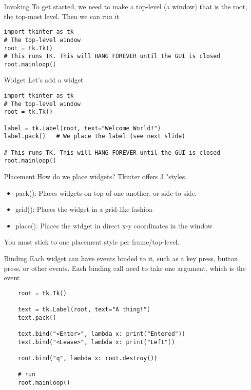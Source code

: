 \begin{frame}[containsverbatim]{Invoking}
To get started, we need to make a top-level (a window) that is the root, the top-most level. Then we can run it
    \begin{verbatim}
import tkinter as tk
# The top-level window
root = tk.Tk()
# This runs TK. This will HANG FOREVER until the GUI is closed
root.mainloop()
  \end{verbatim}
\end{frame}

\begin{frame}[containsverbatim]{Widget}
Let's add a widget
    \begin{verbatim}
import tkinter as tk
# The top-level window
root = tk.Tk()

label = tk.Label(root, text="Welcome World!")
label.pack()   # We place the label (see next slide)

# This runs TK. This will HANG FOREVER until the GUI is closed
root.mainloop()
  \end{verbatim}
\end{frame}

\begin{frame}[containsverbatim]{Placement}
How do we place widgets? Tkinter offers 3 "styles.
\begin{itemize}
  \item pack(): Places widgets on top of one another, or side to side.
  \item grid(): Places the widget in a grid-like fashion
  \item place(): Places the widget in direct x-y coordinates in the window
\end{itemize}
You must stick to one placement style per frame/top-level.
\end{frame}

\begin{frame}[containsverbatim]{Binding}
Each widget can have events binded to it, such as a key press, button press, or other events. Each binding call need to take one argument, which is the event
    \begin{verbatim}
    root = tk.Tk()

    text = tk.Label(root, text="A thing!")
    text.pack()

    text.bind("<Enter>", lambda x: print("Entered"))
    text.bind("<Leave>", lambda x: print("Left"))

    root.bind("q", lambda x: root.destroy())

    # run
    root.mainloop()
  \end{verbatim}
\end{frame}

